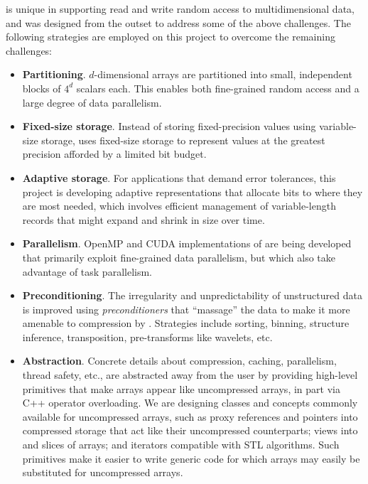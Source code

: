 {\zfp} is unique in supporting read and write random access to
multidimensional data, and was designed from the outset to address
some of the above challenges.  The following strategies are employed on
this project to overcome the remaining challenges:
%
\begin{itemize}
\item \textbf{Partitioning}.  $d$-dimensional arrays are partitioned
into small, independent blocks of $4^d$ scalars each.  This enables both
fine-grained random access and a large degree of data parallelism.

\item \textbf{Fixed-size storage}.  Instead of storing fixed-precision
values using variable-size storage, {\zfp} uses fixed-size storage to
represent values at the greatest precision afforded by a limited
bit budget.

\item \textbf{Adaptive storage}.  For applications that demand error
tolerances, this project is developing adaptive representations that
allocate bits to where they are most needed, which involves efficient
management of variable-length records that might expand and shrink in
size over time.

\item \textbf{Parallelism}.  OpenMP and CUDA implementations of {\zfp}
are being developed that primarily exploit fine-grained data parallelism,
but which also take advantage of task parallelism.

\item \textbf{Preconditioning}.  The irregularity and unpredictability
of unstructured data is improved using \emph{preconditioners} that
``massage'' the data to make it more amenable to compression by {\zfp}.
Strategies include sorting, binning, structure inference, transposition,
pre-transforms like wavelets, etc.

\item \textbf{Abstraction}.  Concrete details about compression, caching,
parallelism, thread safety, etc., are abstracted away from the user by
providing high-level primitives that make {\zfp} arrays appear like
uncompressed arrays, in part via C++ operator overloading.  We are
designing classes and concepts commonly available for uncompressed arrays,
such as proxy references and pointers into compressed storage that act
like their uncompressed counterparts; views into and slices of arrays;
and iterators compatible with STL algorithms.  Such primitives make it
easier to write generic code for which {\zfp} arrays may easily be
substituted for uncompressed arrays.
\end{itemize}

